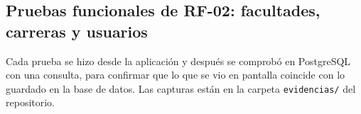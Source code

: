 
\providecommand{\evus}{\textunderscore\allowbreak}
\providecommand{\ev}[1]{{\texttt{\scriptsize\let\_\evus #1}}}

\subsection{Pruebas funcionales de RF-02: facultades, carreras y usuarios}

Cada prueba se hizo desde la aplicación y después se comprobó en PostgreSQL con una
consulta, para confirmar que lo que se vio en pantalla coincide con lo guardado en la base
de datos. Las capturas están en la carpeta \texttt{evidencias/} del repositorio.


